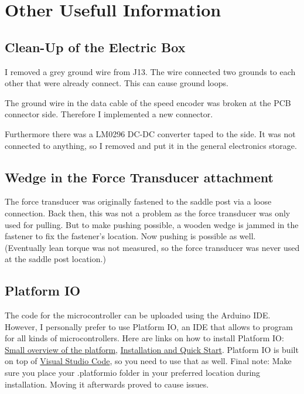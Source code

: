 \section{Other Usefull Information}
\subsection{Clean-Up of the Electric Box}
I removed a grey ground wire from J13. 
The wire connected two grounds to each other that were already connect. This can cause ground loops.

The ground wire in the data cable of the speed encoder was broken at the PCB connector side.
Therefore I implemented a new connector.

Furthermore there was a LM0296 DC-DC converter taped to the side.
It was not connected to anything, so I removed and put it in the general electronics storage.

\subsection{Wedge in the Force Transducer attachment}
The force transducer was originally fastened to the saddle post via a loose connection. Back then, this was not a problem as the force transducer was only used for pulling. But to make pushing possible, a wooden wedge is jammed in the fastener to fix the fastener's location. Now pushing is possible as well. (Eventually lean torque was not measured, so the force transducer was never used at the saddle post location.)

\subsection{Platform IO}
The code for the microcontroller can be uploaded using the Arduino IDE.
However, I personally prefer to use Platform IO, an IDE that allows to program for all kinds of microcontrollers.
Here are links on how to install Platform IO: \href{https://www.youtube.com/watch?v=PYSy_PLjytQ}{Small overview of the platform}, \href{https://docs.platformio.org/en/latest/integration/ide/vscode.html}{Installation and Quick Start}.
Platform IO is built on top of \href{https://code.visualstudio.com}{Visual Studio Code}, so you need to use that as well.
Final note: Make sure you place your .platformio folder in your preferred location during installation.
Moving it afterwards proved to cause issues.

